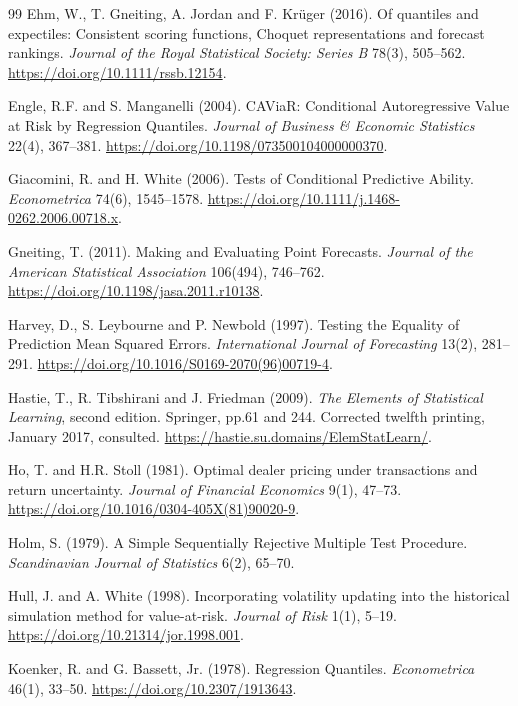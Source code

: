 \begin{thebibliography}{99}
 Ehm, W., T. Gneiting, A. Jordan and F. Kr\"uger (2016).
Of quantiles and expectiles: Consistent scoring functions, Choquet representations and forecast rankings.
\emph{Journal of the Royal Statistical Society: Series B} 78(3), 505--562. \url{https://doi.org/10.1111/rssb.12154}.

 Engle, R.F. and S. Manganelli (2004).
CAViaR: Conditional Autoregressive Value at Risk by Regression Quantiles.
\emph{Journal of Business \& Economic Statistics} 22(4), 367--381. \url{https://doi.org/10.1198/073500104000000370}.

 Giacomini, R. and H. White (2006).
Tests of Conditional Predictive Ability. \emph{Econometrica} 74(6), 1545--1578. \url{https://doi.org/10.1111/j.1468-0262.2006.00718.x}.

 Gneiting, T. (2011).
Making and Evaluating Point Forecasts. \emph{Journal of the American Statistical Association} 106(494), 746--762. \url{https://doi.org/10.1198/jasa.2011.r10138}.

 Harvey, D., S. Leybourne and P. Newbold (1997).
Testing the Equality of Prediction Mean Squared Errors. \emph{International Journal of Forecasting} 13(2), 281--291. \url{https://doi.org/10.1016/S0169-2070(96)00719-4}.

 Hastie, T., R. Tibshirani and J. Friedman (2009).
\emph{The Elements of Statistical Learning}, second edition. Springer, pp.61 and 244.
Corrected twelfth printing, January 2017, consulted. \url{https://hastie.su.domains/ElemStatLearn/}.

 Ho, T. and H.R. Stoll (1981).
Optimal dealer pricing under transactions and return uncertainty. \emph{Journal of Financial Economics} 9(1), 47--73. \url{https://doi.org/10.1016/0304-405X(81)90020-9}.

 Holm, S. (1979).
A Simple Sequentially Rejective Multiple Test Procedure. \emph{Scandinavian Journal of Statistics} 6(2), 65--70.

 Hull, J. and A. White (1998).
Incorporating volatility updating into the historical simulation method for value-at-risk.
\emph{Journal of Risk} 1(1), 5--19. \url{https://doi.org/10.21314/jor.1998.001}.

 Koenker, R. and G. Bassett, Jr. (1978).
Regression Quantiles. \emph{Econometrica} 46(1), 33--50. \url{https://doi.org/10.2307/1913643}.


\end{thebibliography}
